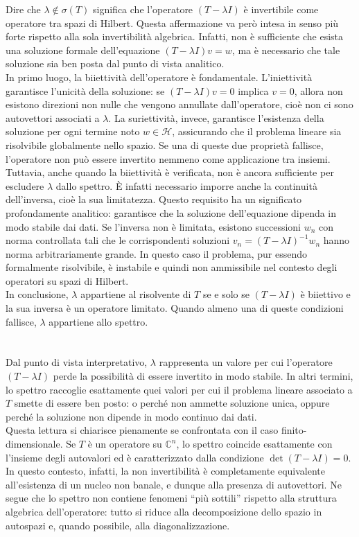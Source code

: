 \documentclass[a4paper,12pt]{report}
\begin{document}
Dire che $\lambda \notin \sigma(T)$ significa che l’operatore $(T-\lambda I)$ è invertibile come operatore tra spazi di Hilbert. Questa affermazione va però intesa in senso più forte rispetto alla sola invertibilità algebrica. Infatti, non è sufficiente che esista una soluzione formale dell’equazione $(T-\lambda I)v = w$, ma è necessario che tale soluzione sia ben posta dal punto di vista analitico.
\\In primo luogo, la biiettività dell’operatore è fondamentale. L’iniettività garantisce l’unicità della soluzione: se $(T-\lambda I)v=0$ implica $v=0$, allora non esistono direzioni non nulle che vengono annullate dall’operatore, cioè non ci sono autovettori associati a $\lambda$. La suriettività, invece, garantisce l’esistenza della soluzione per ogni termine noto $w \in \mathscr{H}$, assicurando che il problema lineare sia risolvibile globalmente nello spazio. Se una di queste due proprietà fallisce, l’operatore non può essere invertito nemmeno come applicazione tra insiemi.
\\Tuttavia, anche quando la biiettività è verificata, non è ancora sufficiente per escludere $\lambda$ dallo spettro. È infatti necessario imporre anche la continuità dell’inversa, cioè la sua limitatezza. Questo requisito ha un significato profondamente analitico: garantisce che la soluzione dell’equazione dipenda in modo stabile dai dati. Se l’inversa non è limitata, esistono successioni $w_n$ con norma controllata tali che le corrispondenti soluzioni $v_n = (T-\lambda I)^{-1}w_n$ hanno norma arbitrariamente grande. In questo caso il problema, pur essendo formalmente risolvibile, è instabile e quindi non ammissibile nel contesto degli operatori su spazi di Hilbert.
\\In conclusione, $\lambda$ appartiene al risolvente di $T$ se e solo se $(T-\lambda I)$ è biiettivo e la sua inversa è un operatore limitato. Quando almeno una di queste condizioni fallisce, $\lambda$ appartiene allo spettro.
\\
\\
\\Dal punto di vista interpretativo, $\lambda$ rappresenta un valore per cui l’operatore $(T-\lambda I)$ perde la possibilità di essere invertito in modo stabile. In altri termini, lo spettro raccoglie esattamente quei valori per cui il problema lineare associato a $T$ smette di essere ben posto: o perché non ammette soluzione unica, oppure perché la soluzione non dipende in modo continuo dai dati.
\\Questa lettura si chiarisce pienamente se confrontata con il caso finito-dimensionale. Se $T$ è un operatore su $\mathbb{C}^n$, lo spettro coincide esattamente con l’insieme degli autovalori ed è caratterizzato dalla condizione $\det(T-\lambda I)=0$. In questo contesto, infatti, la non invertibilità è completamente equivalente all’esistenza di un nucleo non banale, e dunque alla presenza di autovettori. Ne segue che lo spettro non contiene fenomeni “più sottili” rispetto alla struttura algebrica dell’operatore: tutto si riduce alla decomposizione dello spazio in autospazi e, quando possibile, alla diagonalizzazione.
\end{document}
